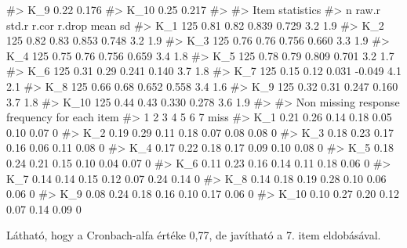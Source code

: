 \documentclass[
  letterpaper,
]{krantz}
\makeatletter
\newenvironment{Shaded}{\begin{snugshade}}{\end{snugshade}}
\newcommand{\CommentTok}[1]{\textcolor[rgb]{0.37,0.37,0.37}{#1}}
\newenvironment{kframe}{%
\medskip{}
\setlength{\fboxsep}{.8em}
 \def\at@end@of@kframe{}%
 \ifinner\ifhmode%
  \def\at@end@of@kframe{\end{minipage}}%
  \begin{minipage}{\columnwidth}%
 \fi\fi%
 \def\FrameCommand##1{\hskip\@totalleftmargin \hskip-\fboxsep
 \colorbox{shadecolor}{##1}\hskip-\fboxsep
     \hskip-\linewidth \hskip-\@totalleftmargin \hskip\columnwidth}%
 \MakeFramed {\advance\hsize-\width
   \@totalleftmargin\z@ \linewidth\hsize
   \@setminipage}}%
 {\par\unskip\endMakeFramed%
 \at@end@of@kframe}
\renewenvironment{Shaded}{\begin{kframe}}{\end{kframe}}
\makeatother
\begin{document}
\begin{Shaded}
\begin{Highlighting}[]
\CommentTok{\#\textgreater{} K\_9   0.22 0.176}
\CommentTok{\#\textgreater{} K\_10  0.25 0.217}
\CommentTok{\#\textgreater{} }
\CommentTok{\#\textgreater{}  Item statistics }
\CommentTok{\#\textgreater{}        n raw.r std.r r.cor r.drop mean  sd}
\CommentTok{\#\textgreater{} K\_1  125  0.81  0.82 0.839  0.729  3.2 1.9}
\CommentTok{\#\textgreater{} K\_2  125  0.82  0.83 0.853  0.748  3.2 1.9}
\CommentTok{\#\textgreater{} K\_3  125  0.76  0.76 0.756  0.660  3.3 1.9}
\CommentTok{\#\textgreater{} K\_4  125  0.75  0.76 0.756  0.659  3.4 1.8}
\CommentTok{\#\textgreater{} K\_5  125  0.78  0.79 0.809  0.701  3.2 1.7}
\CommentTok{\#\textgreater{} K\_6  125  0.31  0.29 0.241  0.140  3.7 1.8}
\CommentTok{\#\textgreater{} K\_7  125  0.15  0.12 0.031 {-}0.049  4.1 2.1}
\CommentTok{\#\textgreater{} K\_8  125  0.66  0.68 0.652  0.558  3.4 1.6}
\CommentTok{\#\textgreater{} K\_9  125  0.32  0.31 0.247  0.160  3.7 1.8}
\CommentTok{\#\textgreater{} K\_10 125  0.44  0.43 0.330  0.278  3.6 1.9}
\CommentTok{\#\textgreater{} }
\CommentTok{\#\textgreater{} Non missing response frequency for each item}
\CommentTok{\#\textgreater{}         1    2    3    4    5    6    7 miss}
\CommentTok{\#\textgreater{} K\_1  0.21 0.26 0.14 0.18 0.05 0.10 0.07    0}
\CommentTok{\#\textgreater{} K\_2  0.19 0.29 0.11 0.18 0.07 0.08 0.08    0}
\CommentTok{\#\textgreater{} K\_3  0.18 0.23 0.17 0.16 0.06 0.11 0.08    0}
\CommentTok{\#\textgreater{} K\_4  0.17 0.22 0.18 0.17 0.09 0.10 0.08    0}
\CommentTok{\#\textgreater{} K\_5  0.18 0.24 0.21 0.15 0.10 0.04 0.07    0}
\CommentTok{\#\textgreater{} K\_6  0.11 0.23 0.16 0.14 0.11 0.18 0.06    0}
\CommentTok{\#\textgreater{} K\_7  0.14 0.14 0.15 0.12 0.07 0.24 0.14    0}
\CommentTok{\#\textgreater{} K\_8  0.14 0.18 0.19 0.28 0.10 0.06 0.06    0}
\CommentTok{\#\textgreater{} K\_9  0.08 0.24 0.18 0.16 0.10 0.17 0.06    0}
\CommentTok{\#\textgreater{} K\_10 0.10 0.27 0.20 0.12 0.07 0.14 0.09    0}
\end{Highlighting}
\end{Shaded}

Látható, hogy a Cronbach-alfa értéke 0,77, de javítható a 7. item
eldobásával.
\end{document}
